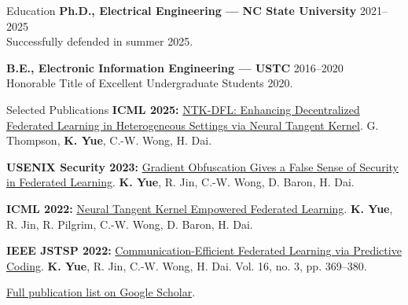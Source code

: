 \documentclass{resume}
\begin{document}
\begin{rSection}{Education}
    \textbf{Ph.D., Electrical Engineering --- NC State University} \hfill 2021--2025\\
    Successfully defended in summer 2025.

    \textbf{B.E., Electronic Information Engineering --- USTC} \hfill 2016--2020\\
    Honorable Title of Excellent Undergraduate Students 2020.
\end{rSection}

\begin{rSection}{Selected Publications}
    \textbf{ICML 2025:}
    \href{https://proceedings.mlr.press/v267/thompson25a.html}{NTK-DFL: Enhancing Decentralized Federated Learning in Heterogeneous Settings via Neural Tangent Kernel}.
    G. Thompson, \textbf{K. Yue}, C.-W. Wong, H. Dai.

    \textbf{USENIX Security 2023:}
    \href{https://www.usenix.org/conference/usenixsecurity23/presentation/yue}{Gradient Obfuscation Gives a False Sense of Security in Federated Learning}.
    \textbf{K. Yue}, R. Jin, C.-W. Wong, D. Baron, H. Dai.

    \textbf{ICML 2022:}
    \href{https://arxiv.org/abs/2110.03681}{Neural Tangent Kernel Empowered Federated Learning}.
    \textbf{K. Yue}, R. Jin, R. Pilgrim, C.-W. Wong, D. Baron, H. Dai.

    \textbf{IEEE JSTSP 2022:}
    \href{https://predfl.netlify.app/}{Communication-Efficient Federated Learning via Predictive Coding}.
    \textbf{K. Yue}, R. Jin, C.-W. Wong, H. Dai. Vol. 16, no. 3, pp. 369--380.

    \href{https://scholar.google.com/citations?user=5uWEGF8AAAAJ&hl=en}{Full publication list on Google Scholar}.
\end{rSection}
\end{document}
